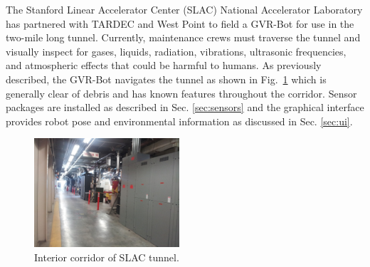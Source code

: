 The Stanford Linear Accelerator Center (SLAC) National Accelerator Laboratory has partnered with TARDEC and West Point to field a GVR-Bot for use in the two-mile long tunnel. Currently, maintenance crews must traverse the tunnel and visually inspect for gases, liquids, radiation, vibrations, ultrasonic frequencies, and atmospheric effects that could be harmful to humans. As previously described, the GVR-Bot navigates the tunnel as shown in Fig.~\ref{fig:tunnel} which is generally clear of debris and has known features throughout the corridor. Sensor packages are installed as described in Sec. \ref{sec:sensors} and the graphical interface provides robot pose and environmental information as discussed in Sec. \ref{sec:ui}.

\begin{figure}
	\centering
	\includegraphics[width=0.48\textwidth]{./pictures/slac-tunnel.jpg}
	\caption{Interior corridor of SLAC tunnel.}
	\label{fig:tunnel}
\end{figure}
